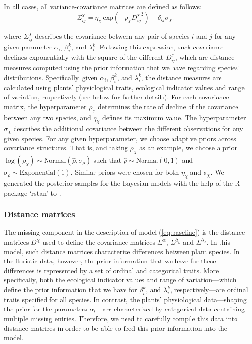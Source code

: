 \documentclass[11pt, a4paper]{article}
\begin{document}
In all cases, all variance-covariance matrices are defined as follows:
\begin{equation} 
\Sigma^{\chi}_{ij} = \eta_{\chi}\,\text{exp}\left(-\rho_{\chi} {D^{\chi}_{ij}}^2\right) + \delta_{ij} \sigma_{\chi} ,
\label{eq:covariance}
\end{equation}

where $\Sigma^{\chi}_{ij}$ describes the covariance between any pair of species $i$ and $j$ for any given parameter $\alpha_i$, $\beta_i^k$, and $\lambda_i^k$. Following this expression, such covariance declines exponentially with the square of the different $D^{\chi}_{ij}$, which are distance measures computed using the prior information that we have regarding species' distributions. Specifically, given $\alpha_i$, $\beta_i^k$, and $\lambda_i^k$, the distance measures are calculated using plants' physiological traits, ecological indicator values and range of variation, respectively (see below for further details). For each covariance matrix, the hyperparameter $\rho_{\chi}$ determines the rate of decline of the covariance between any two species, and $\eta_{\chi}$ defines its maximum value. The hyperparameter $\sigma_{\chi}$ describes the additional covariance between the different observations for any given species. For any given hyperparameter, we choose adaptive priors across covariance structures. That is, and taking $\rho_{\chi}$ as an example, we choose a prior $\log\left(\rho_{\chi}\right)\sim \text{Normal}\left(\hat{\rho}, \sigma_{\rho}\right)$ such that $\hat{\rho}\sim \text{Normal}\left(0, 1\right)$ and $\sigma_{\rho}\sim \text{Exponential}\left(1\right)$. Similar priors were chosen for both $\eta_{\chi}$ and $\sigma_{\chi}$. We generated the posterior samples for the Bayesian models with the help of the R package `rstan' to \citep{rstan}.

\subsubsection*{Distance matrices}
The missing component in the description of model (\ref{eq:baseline}) is the distance matrices $D^{\chi}$ used to define the covariance matrices $\Sigma^{\alpha}$, $\Sigma^{\beta_{k}}$ and $\Sigma^{\lambda_{k}}$. In this model, such distance matrices characterize differences between plant species. In the floristic data, however, the prior information that we have for these differences is represented by a set of ordinal and categorical traits. More specifically, both the ecological indicator values and range of variation---which define the prior information that we have for $\beta_i^k$, and $\lambda_i^k$, respectively---are ordinal traits specified for all species. In contrast, the plants' physiological data---shaping the prior for the parameters $\alpha_i$---are characterized by categorical data containing multiple missing entries. Therefore, we need to carefully compile this data into distance matrices in order to be able to feed this prior information into the model. 
\end{document}
